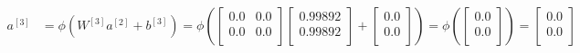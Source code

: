 \documentclass{exam}
\begin{document}
\begin{questions}
\begin{itemize}
\begin{align*}
                a^{[3]} &= \phi(W^{[3]}a^{[2]} + b^{[3]}) = \phi\left(
                \begin{bmatrix}
                    0.0 & 0.0  \\
                    0.0 & 0.0  \\
                \end{bmatrix} 
                \begin{bmatrix}
                    0.99892  \\
                    0.99892  \\
                \end{bmatrix} + 
                \begin{bmatrix}
                    0.0  \\
                    0.0  \\
                \end{bmatrix} \right) 
                = \phi \left(
                \begin{bmatrix}
                    0.0  \\
                    0.0  \\
                \end{bmatrix} \right) =
                \begin{bmatrix}
                    0.0  \\
                    0.0  \\   
                \end{bmatrix}
            \end{align*}


\end{itemize}
\end{questions}
\end{document}
